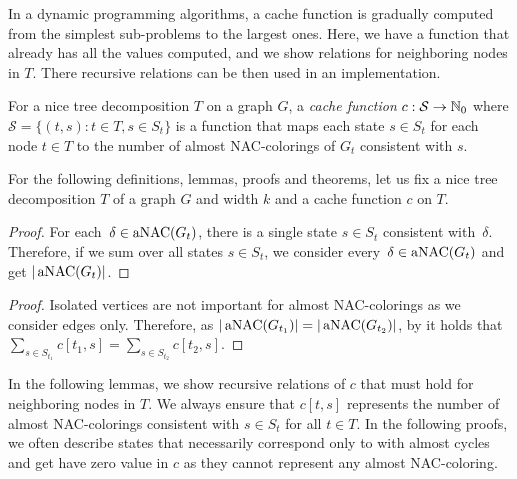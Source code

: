 In a dynamic programming algorithms, a cache function is gradually computed
from the simplest sub-problems to the largest ones.
Here, we have a function that already has all the values computed,
and we show relations for neighboring nodes in \( T \).
There recursive relations can be then used in an implementation.
%
\begin{definition}
	For a nice tree decomposition \( T \) on a graph \( G \),
	a \emph{cache function} \( c: \mathcal{S} \to \mathbb{N}_0 \)
	where \( \mathcal{S} = \{ (t,s): t \in T, s \in S_t \} \)
	is a function that maps each state \( s \in S_t \) for each node \( t \in T \)
	to the number of almost NAC-colorings of \( G_t \) consistent with \( s \).
\end{definition}
%
For the following definitions, lemmas, proofs and theorems, let us fix
a nice tree decomposition \( T \) of a graph \( G \) and width \( k \)
and a cache function \( c \) on \( T \).
%
%
\begin{proof}
	For each~\( \delta \in \operatorname{aNAC}(G_t) \),
	there is a single state \( s \in S_t \) consistent with~\( \delta \).
	Therefore, if we sum over all states \( s \in S_t \),
	we consider every~\( \delta \in \operatorname{aNAC}(G_t) \) and get \( |\operatorname{aNAC}(G_t)| \).
\end{proof}
%
%
\begin{proof}
	Isolated vertices are not important for almost NAC-colorings
	as we consider edges only.
	Therefore, as \( |\operatorname{aNAC}(G_{t_1})| = |\operatorname{aNAC}(G_{t_2})| \),
	by 
	it holds that \( \sum_{s \in S_{t_1}} c[t_1, s] = \sum_{s \in S_{t_2}} c[t_2, s] \).
\end{proof}
%

In the following lemmas, we show recursive relations of \( c \) that must hold
for neighboring nodes in \( T \).
We always ensure that \( c[t, s] \)
represents the number of almost NAC-colorings
consistent with \( s \in S_t \) for all \( t \in T  \).
%
In the following proofs,
we often describe states that necessarily correspond only
to \rbcol{} with almost cycles and
get have zero value in \( c \) as they cannot represent any almost NAC-coloring.

